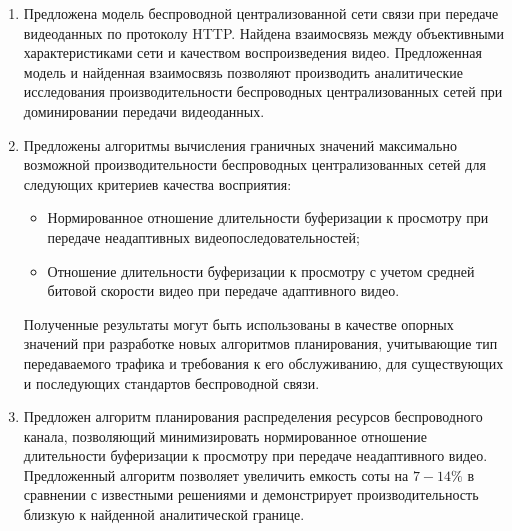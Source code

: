 \begin{enumerate}
    \item Предложена модель беспроводной централизованной сети связи при передаче видеоданных по протоколу HTTP. Найдена взаимосвязь между объективными характеристиками сети и качеством воспроизведения видео. Предложенная модель и найденная взаимосвязь позволяют производить аналитические исследования производительности беспроводных централизованных сетей при доминировании передачи видеоданных.
    \item Предложены алгоритмы вычисления граничных значений максимально возможной производительности беспроводных централизованных сетей для следующих критериев качества восприятия:
    \begin{itemize}
	    \item Нормированное отношение длительности буферизации к просмотру при передаче неадаптивных видеопоследовательностей;
	    \item Отношение длительности буферизации к просмотру с учетом средней битовой скорости видео при передаче адаптивного видео.
    \end{itemize}
    Полученные результаты могут быть использованы в качестве опорных значений при разработке новых алгоритмов планирования, учитывающие тип передаваемого трафика и требования к его обслуживанию, для существующих и последующих стандартов беспроводной связи.
    \item Предложен алгоритм планирования распределения ресурсов беспроводного канала, позволяющий минимизировать нормированное отношение длительности буферизации к просмотру при передаче неадаптивного видео. Предложенный алгоритм позволяет увеличить емкость соты на $7-14\%$ в сравнении с известными решениями и демонстрирует производительность близкую к найденной аналитической границе.
\end{enumerate}
